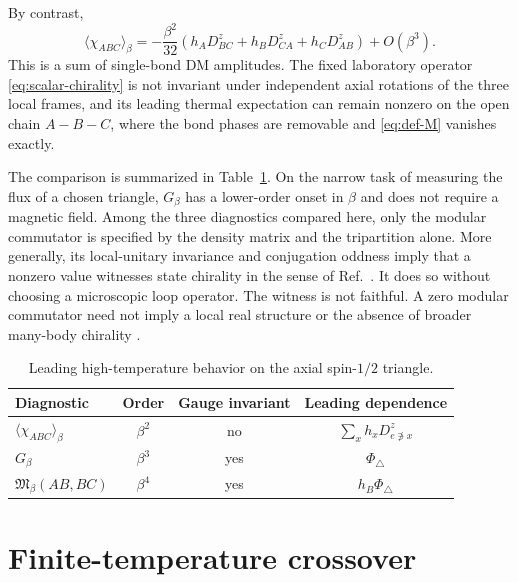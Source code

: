 \documentclass[11pt]{article}
\newcommand{\Mmod}{\mathfrak{M}}
\newcommand{\PhiTri}{\Phi_\triangle}
\newenvironment{ruledtabular}{}{}
\begin{document}
By contrast,
\begin{equation}
 \langle\chi_{ABC}\rangle_\beta
 =-\frac{\beta^2}{32}\left(
 h_AD_{BC}^z+h_BD_{CA}^z+h_CD_{AB}^z\right)+O(\beta^3).
 \label{eq:chi-leading}
\end{equation}
This is a sum of single-bond DM amplitudes.  The fixed laboratory operator
\eqref{eq:scalar-chirality} is not invariant under independent axial rotations
of the three local frames, and its leading thermal expectation can remain
nonzero on the open chain $A-B-C$, where the bond phases are removable
and \eqref{eq:def-M} vanishes exactly.

The comparison is summarized in Table~\ref{tab:diagnostics}.  On the narrow
task of measuring the flux of a chosen triangle, $G_\beta$ has a lower-order
onset in $\beta$ and does not require a magnetic field.  Among the three diagnostics
compared here, only the modular commutator is specified by the density matrix
and the tripartition alone.  More generally, its local-unitary invariance and
conjugation oddness imply that a nonzero value witnesses state chirality in
the sense of Ref.~\cite{VardhanEtAl2026}.  It does so without choosing a
microscopic loop operator.  The witness is not faithful.  A zero modular
commutator need not imply a local real structure or the absence of broader
many-body chirality \cite{EllisonEtAl2026}.

\begin{table}[b]
\caption{Leading high-temperature behavior on the axial spin-$1/2$ triangle.}
\label{tab:diagnostics}
\begin{ruledtabular}
\begin{tabular}{lccc}
Diagnostic & Order & Gauge invariant & Leading dependence\\
\hline
$\langle\chi_{ABC}\rangle_\beta$ & $\beta^2$ & no
& $\sum_x h_xD^z_{e\not\ni x}$\\
$G_\beta$ & $\beta^3$ & yes & $\PhiTri$\\
$\Mmod_\beta(AB,BC)$ & $\beta^4$ & yes & $h_B\PhiTri$\\
\end{tabular}
\end{ruledtabular}
\end{table}

\section{Finite-temperature crossover}
\label{sec:finite-temperature}
\end{document}
